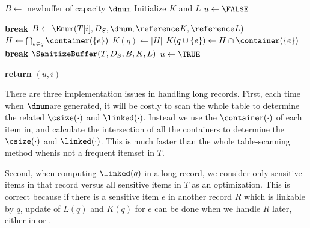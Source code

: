 \begin{algorithm}[th]
\caption{$\HandleLongRecord(\reference T, D_S, i, \dnum)$}
\label{algo:handlelong}
\begin{algorithmic}[1]
    \STATE $B\leftarrow$ new\qid buffer of capacity $\dnum$
    \STATE Initialize $K$ and $L$
    \STATE $u\leftarrow\FALSE$

    \LOOP
        {
            \textbf{break}
        \ENDIF}
        \STATE $B\leftarrow\Enum(T[i], D_S, \dnum, \reference K, \reference L)$
            \STATE $H\leftarrow\bigcap_{e\in q}\container(\{e\})$
            \STATE $K(q)\leftarrow|H|$
              \STATE $K(q\cup\{e\})\leftarrow H\cap\container(\{e\})$
            \ENDFOR
        \ENDFOR
        {
            \textbf{break}
        \ENDIF}
         \label{line:handle-long-if-contains-unsafe}
            \STATE $\SanitizeBuffer(T, D_S, B, K, L)$
            \STATE $u\leftarrow\TRUE$
        \ENDIF
    \ENDLOOP

    \STATE \textbf{return} $(u,i)$ \label{line:handle-long-return}
\end{algorithmic}
\end{algorithm}

There are three implementation issues in handling long records.
First, each time when $\dnum$\qids are generated,
it will be costly to scan the whole table to determine the related
$\csize(\cdot)$ and $\linked(\cdot)$.
Instead we use the $\container(\cdot)$ of each item in\qidx,
and calculate the intersection of all the containers to determine
the $\csize(\cdot)$ and $\linked(\cdot)$.
This is much faster than the whole table-scanning method when\qid is not a frequent itemset in $T$.

Second, when computing $\linked(q)$ in a long record,
we consider only sensitive items in that record versus all sensitive items in $T$ as an optimization.
This is correct because if there is a sensitive item $e$ in another record $R$
which is linkable by $q$, update of $L(q)$ and $K(q)$ for $e$ can be done
when we handle $R$ later, either in \HandleShortRecords or \HandleLongRecord.

